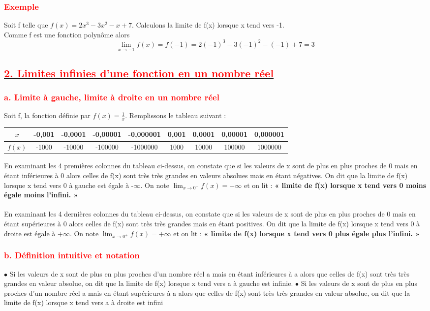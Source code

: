 \documentclass[12pt]{article}
\begin{document}
\subsubsection*{\textcolor{red}{Exemple}}
Soit f telle que $f(x) = 2x^{3}-3x^{2}-x+7.$ Calculons la limite de f(x) lorsque x tend vers -1.\\
Comme f est une fonction polynôme alors\\ 
\[\lim_{x \to -1}f(x)=f(-1)=2(-1)^{3}-3(-1)^{2}-(-1)+7=3\]
\subsection*{\underline{\textbf{\textcolor{red}{2. Limites infinies d’une fonction en un nombre réel}}}}
\subsubsection*{\textcolor{red}{a. Limite à gauche, limite à droite en un nombre réel}}
Soit f, la fonction définie par $f(x) = \frac{1}{x}$. Remplissons le tableau suivant :
\begin{center}
\begin{tabular}{|c|c|c|c|c|c|c|c|c|}
\hline
$x$ & -0,001 & -0,0001 & -0,00001 & -0,000001 & 0,001 & 0,0001 & 0,00001 & 0,000001\\
\hline
$f(x)$ &-1000 &-10000 &-100000 &-1000000 &1000 &10000 &100000 &1000000\\
\hline
\end{tabular}
\end{center}
En examinant les 4 premières colonnes du tableau ci-dessus, on constate que si les valeurs de x
sont de plus en plus proches de 0 mais en étant inférieures à 0 alors celles de f(x) sont très très grandes en valeurs absolues mais en étant négatives. On dit que la limite de f(x) lorsque x tend vers 0 à gauche est égale à -$\infty$. On note 
$\lim_{x \to 0^{-}}f(x)=-\infty$ et on lit : \textbf{« limite de f(x) lorsque x tend vers 0 moins égale moins l’infini. »}\\
\\
En examinant les 4 dernières colonnes du tableau ci-dessus, on constate que si les valeurs de x
sont de plus en plus proches de 0 mais en étant supérieures à 0 alors celles de f(x) sont très très
grandes mais en étant positives. On dit que la limite de f(x) lorsque x tend vers 0 à droite est
égale à +$\infty$. On note $\lim_{x \to 0^{+}}f(x)=+\infty$ et on lit : 
\textbf{« limite de f(x) lorsque x tend vers 0 plus égale plus l’infini. »}
\subsubsection*{\textcolor{red}{b. Définition intuitive et notation}}
$\bullet$ Si les valeurs de x sont de plus en plus proches d’un nombre réel a mais en étant
inférieures à a alors que celles de f(x) sont très très grandes en valeur absolue, on dit que
la limite de f(x) lorsque x tend vers a à gauche est infinie.
$\bullet$ Si les valeurs de x sont de plus en plus proches d’un nombre réel a mais en étant
supérieures à a alors que celles de f(x) sont très très grandes en valeur absolue, on dit que
la limite de f(x) lorsque x tend vers a à droite est infini
\end{document}
